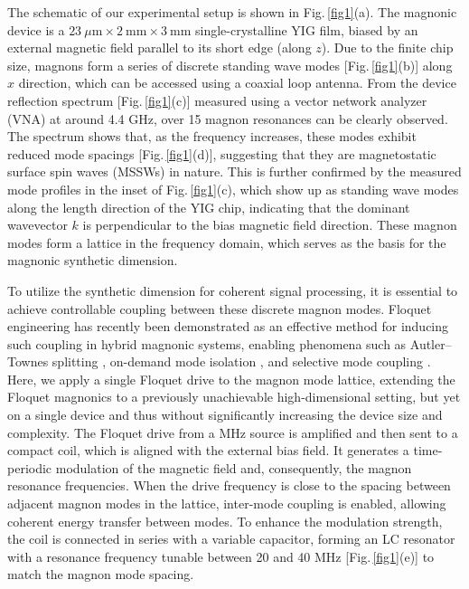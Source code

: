 \documentclass[
twocolumn,

superscriptaddress,









 amsmath,amssymb,
 aps,


prl,




]{revtex4-2}
\begin{document}
The schematic of our experimental setup is shown in Fig.\,\ref{fig1}(a). The magnonic device is a $23~\mu \mathrm{m} \times 2~ \mathrm{mm} \times 3~\mathrm{mm}$ single-crystalline YIG film, biased by an external magnetic field parallel to its short edge (along $z$). Due to the finite chip size, magnons form a series of discrete standing wave modes [Fig.\,\ref{fig1}(b)] along $x$ direction, which can be accessed using a coaxial loop antenna. From the device reflection spectrum [Fig.\,\ref{fig1}(c)] measured using a vector network analyzer (VNA) at around 4.4 GHz, over 15 magnon resonances can be clearly observed. The spectrum shows that, as the frequency increases, these modes exhibit reduced mode spacings [Fig.\,\ref{fig1}(d)], suggesting that they are magnetostatic surface spin waves (MSSWs) in nature. This is further confirmed by the measured mode profiles in the inset of Fig.\,\ref{fig1}(c), which show up as standing wave modes along the length direction of the YIG chip, indicating that the dominant wavevector $k$ is perpendicular to the bias magnetic field direction. These magnon modes form a lattice in the frequency domain, which serves as the basis for the magnonic synthetic dimension.


To utilize the synthetic dimension for coherent signal processing, it is essential to achieve controllable coupling between these discrete magnon modes. Floquet engineering has recently been demonstrated as an effective method for inducing such coupling in hybrid magnonic systems, enabling phenomena such as Autler–Townes splitting  \cite{FloquetCavityElectromagnonics}, on-demand mode isolation \cite{On-demandmagnonresonanceisolation}, and selective mode coupling \cite{Li2023FloquetMagnon}. Here, we apply a single Floquet drive to the magnon mode lattice, extending the Floquet magnonics to a previously unachievable high-dimensional setting, but yet on a single device and thus without significantly increasing the device size and complexity. The Floquet drive from a MHz source is amplified and then sent to a compact coil, which is aligned with the external bias field. It generates a time-periodic modulation of the magnetic field and, consequently, the magnon resonance frequencies. When the drive frequency is close to the spacing between adjacent magnon modes in the lattice, inter-mode coupling is enabled, allowing coherent energy transfer between modes. To enhance the modulation strength, the coil is connected in series with a variable capacitor, forming an LC resonator with a resonance frequency tunable between 20 and 40 MHz [Fig.\,\ref{fig1}(e)] to match the magnon mode spacing.
\end{document}
